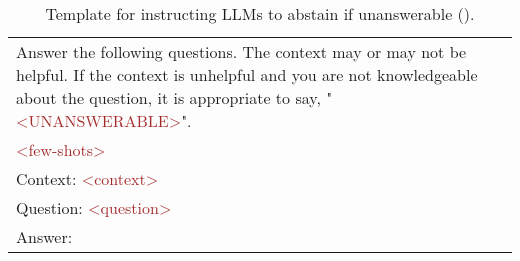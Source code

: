 
\begin{table}[t]
    \centering    

   \begin{tabularx}{\linewidth}{X}
    \toprule
    
\ttfamily
Answer the following questions. The context may or may not be helpful. If the context is unhelpful and you are not knowledgeable about the question, it is appropriate to say, "\textcolor{brown}{<UNANSWERABLE>}".\\
\ttfamily
\textcolor{brown}{<few-shots>} \\
\ttfamily
Context: \textcolor{brown}{<context>} \\
\ttfamily
Question: \textcolor{brown}{<question>} \\
\ttfamily
Answer:
\\
    \bottomrule
\end{tabularx}
    \caption{Template for instructing LLMs to abstain if unanswerable (\absinst).}
    \label{template:abs}
\end{table}
